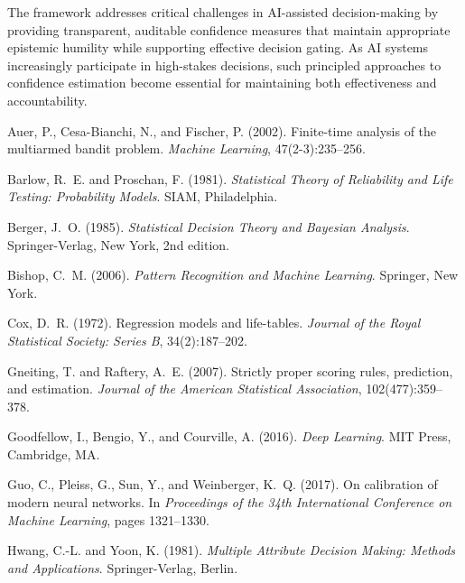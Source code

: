 \documentclass[12pt,a4paper]{article}
\begin{document}
The framework addresses critical challenges in AI-assisted decision-making by providing transparent, auditable confidence measures that maintain appropriate epistemic humility while supporting effective decision gating. As AI systems increasingly participate in high-stakes decisions, such principled approaches to confidence estimation become essential for maintaining both effectiveness and accountability.



\begin{thebibliography}{99}

Auer, P., Cesa-Bianchi, N., and Fischer, P. (2002).
\newblock Finite-time analysis of the multiarmed bandit problem.
\newblock \emph{Machine Learning}, 47(2-3):235--256.

Barlow, R.~E. and Proschan, F. (1981).
\newblock \emph{Statistical Theory of Reliability and Life Testing: Probability Models}.
\newblock SIAM, Philadelphia.

Berger, J.~O. (1985).
\newblock \emph{Statistical Decision Theory and Bayesian Analysis}.
\newblock Springer-Verlag, New York, 2nd edition.

Bishop, C.~M. (2006).
\newblock \emph{Pattern Recognition and Machine Learning}.
\newblock Springer, New York.

Cox, D.~R. (1972).
\newblock Regression models and life-tables.
\newblock \emph{Journal of the Royal Statistical Society: Series B}, 34(2):187--202.

Gneiting, T. and Raftery, A.~E. (2007).
\newblock Strictly proper scoring rules, prediction, and estimation.
\newblock \emph{Journal of the American Statistical Association}, 102(477):359--378.

Goodfellow, I., Bengio, Y., and Courville, A. (2016).
\newblock \emph{Deep Learning}.
\newblock MIT Press, Cambridge, MA.

Guo, C., Pleiss, G., Sun, Y., and Weinberger, K.~Q. (2017).
\newblock On calibration of modern neural networks.
\newblock In \emph{Proceedings of the 34th International Conference on Machine Learning}, pages 1321--1330.

Hwang, C.-L. and Yoon, K. (1981).
\newblock \emph{Multiple Attribute Decision Making: Methods and Applications}.
\newblock Springer-Verlag, Berlin.


\end{thebibliography}
\end{document}
